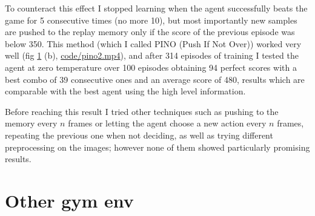 \documentclass[a4paper, 11pt]{article}
\begin{document}
  To counteract this effect I stopped learning when the agent successfully beats the game for 5 consecutive times (no more 10), but most importantly new samples are pushed to the replay memory only if the score of the previous episode was below 350. This method (which I called PINO (Push If Not Over)) worked very well (fig \ref{fig:pixels} (b), \url{code/pino2.mp4}), and after 314 episodes of training I tested the agent at zero temperature over 100 episodes obtaining 94 perfect scores with a best combo of 39 consecutive ones and an average score of 480, results which are comparable with the best agent using the high level information.

  Before reaching this result I tried other techniques such as pushing to the memory every $n$ frames or letting the agent choose a new action every $n$ frames, repeating the previous one when not deciding, as well as trying different preprocessing on the images; however none of them showed particularly promising results.

  \begin{figure}
    \centering
     \quad
    \caption{}
    \label{fig:pixels}
  \end{figure}



\section{Other gym env}
\end{document}
